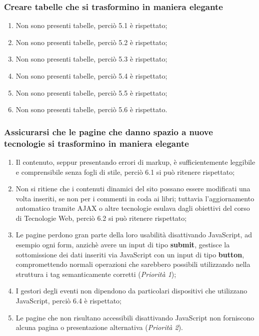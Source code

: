 \subsubsection{Creare tabelle che si trasformino in maniera elegante}
\begin{enumerate}
\item Non sono presenti tabelle, perciò 5.1 è rispettato;
\item Non sono presenti tabelle, perciò 5.2 è rispettato;
\item Non sono presenti tabelle, perciò 5.3 è rispettato;
\item Non sono presenti tabelle, perciò 5.4 è rispettato;
\item Non sono presenti tabelle, perciò 5.5 è rispettato;
\item Non sono presenti tabelle, perciò 5.6 è rispettato.
\end{enumerate}

\subsubsection{Assicurarsi che le pagine che danno spazio a nuove tecnologie
si trasformino in maniera elegante}
\begin{enumerate}
\item Il contenuto, seppur presentando errori di markup, è sufficientemente
leggibile e comprensibile senza fogli di stile, perciò 6.1 si può ritenere
rispettato;
\item Non si ritiene che i contenuti dinamici del sito possano essere
modificati una volta inseriti, se non per i commenti in coda ai libri;
tuttavia l'aggiornamento automatico tramite AJAX o altre tecnologie esulava
dagli obiettivi del corso di Tecnologie Web, perciò 6.2 si può ritenere
rispettato;
\item Le pagine perdono gran parte della loro usabilità disattivando
JavaScript, ad esempio ogni form, anzichè avere un input di tipo
\textbf{submit}, gestisce la sottomissione dei dati inseriti via JavaScript
con un input di tipo \textbf{button}, compromettendo normali operazioni che
sarebbero possibili utilizzando nella struttura i tag semanticamente corretti
(\textit{Priorità 1});
\item I gestori degli eventi non dipendono da particolari dispositivi che
utilizzano JavaScript, perciò 6.4 è rispettato;
\item Le pagine che non risultano accessibili disattivando JavaScript non
forniscono alcuna pagina o presentazione alternativa (\textit{Priorità 2}).
\end{enumerate}

